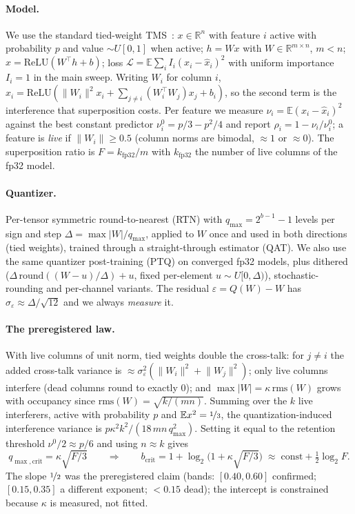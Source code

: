 \documentclass{article}
\begin{document}
\paragraph{Model.} We use the standard tied-weight TMS~\cite{elhage2022toy}: $x\in\mathbb{R}^n$ with feature $i$
active with probability $p$ and value $\sim U[0,1]$ when active; $h = Wx$ with $W\in\mathbb{R}^{m\times n}$, $m<n$;
$\hat x = \mathrm{ReLU}(W^\top h + b)$; loss $\mathcal{L} = \mathbb{E}\sum_i I_i (x_i-\hat x_i)^2$ with uniform
importance $I_i=1$ in the main sweep. Writing $W_i$ for column $i$,
$\hat x_i = \mathrm{ReLU}(\lVert W_i\rVert^2 x_i + \sum_{j\ne i}(W_i^{\top}W_j)x_j + b_i)$, so the second term is the
interference that superposition costs. Per feature we measure $\nu_i = \mathbb{E}(x_i-\hat x_i)^2$ against the best
constant predictor $\nu_i^0 = p/3 - p^2/4$ and report $\rho_i = 1-\nu_i/\nu_i^0$; a feature is \emph{live} if
$\lVert W_i\rVert\ge 0.5$ (column norms are bimodal, $\approx1$ or $\approx0$). The superposition ratio is
$F = k_{\mathrm{fp32}}/m$ with $k_{\mathrm{fp32}}$ the number of live columns of the fp32 model.

\paragraph{Quantizer.} Per-tensor symmetric round-to-nearest (RTN) with $q_{\max}=2^{b-1}-1$ levels per sign and
step $\Delta=\max|W|/q_{\max}$, applied to $W$ once and used in both directions (tied weights), trained through a
straight-through estimator (QAT). We also use the same quantizer post-training (PTQ) on converged fp32 models,
plus dithered ($\Delta\,\mathrm{round}((W-u)/\Delta)+u$, fixed per-element $u\sim U[0,\Delta)$), stochastic-rounding
and per-channel variants. The residual $\varepsilon=Q(W)-W$ has $\sigma_\varepsilon\approx\Delta/\sqrt{12}$ and we
always \emph{measure} it.

\paragraph{The preregistered law.} With live columns of unit norm, tied weights double the cross-talk:
for $j\neq i$ the added cross-talk variance is $\approx\sigma_\varepsilon^2(\lVert W_i\rVert^2+\lVert W_j\rVert^2)$;
only live columns interfere (dead columns round to exactly $0$); and $\max|W|=\kappa\,\mathrm{rms}(W)$ grows with
occupancy since $\mathrm{rms}(W)=\sqrt{k/(mn)}$. Summing over the $k$ live interferers, active with probability
$p$ and $\mathbb{E}x^2=\nicefrac13$, the quantization-induced interference variance is
$p\kappa^2k^2/(18\,mn\,q_{\max}^2)$. Setting it equal to the retention threshold $\nu^0/2\approx p/6$ and using
$n\approx k$ gives
\begin{equation}
q_{\max,\mathrm{crit}} = \kappa\sqrt{F/3}\qquad\Longrightarrow\qquad
b_{\mathrm{crit}} = 1+\log_2\!\big(1+\kappa\sqrt{F/3}\big)\;\approx\;\mathrm{const}+\tfrac12\log_2 F .
\label{eq:law}
\end{equation}
The slope $\nicefrac12$ was the preregistered claim (bands: $[0.40,0.60]$ confirmed; $[0.15,0.35]$ a different
exponent; $<0.15$ dead); the intercept is constrained because $\kappa$ is measured, not fitted.
\end{document}
